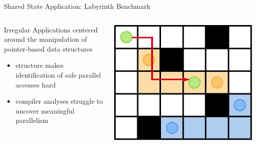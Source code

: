 \documentclass[aspectratio=169, usenames, dvipsnames]{beamer}
\begin{document}
\begin{frame}{Shared State Application: Labyrinth Benchmark}
  \begin{columns}
    \begin{column}{0.5\textwidth}
        \begin{block}{Irregular Applications}
            centered around the manipulation of pointer-based data structures
        \end{block}
        
        \hfill

        \begin{itemize}
            \item<2-> structure makes identification of safe parallel accesses hard
            \item<3-> compiler analyses struggle to uncover meaningful parallelism
        \end{itemize}
    \end{column}
    \begin{column}{0.5\textwidth}
      \begin{center}
        \includegraphics[width=.9\textwidth]{img/5-maze_update3}%
      \end{center}
    \end{column}
  \end{columns}
\end{frame}
\end{document}
